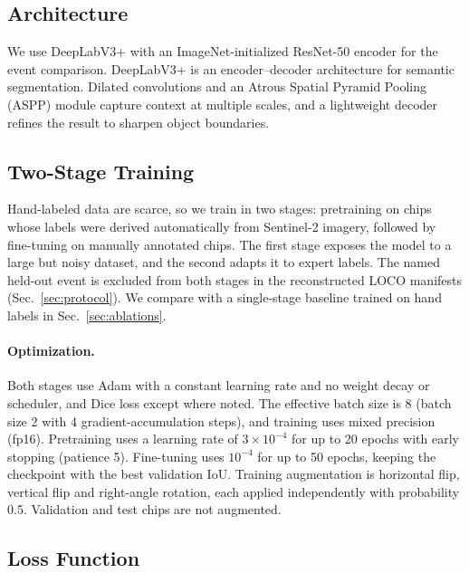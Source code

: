 \subsection{Architecture}

We use DeepLabV3+ \cite{chen2018deeplabv3plus} with an ImageNet-initialized
ResNet-50 encoder \cite{he2016resnet} for the event comparison.
DeepLabV3+ is an encoder--decoder architecture for semantic segmentation.
Dilated convolutions and an Atrous Spatial Pyramid Pooling (ASPP) module
capture context at multiple scales, and a lightweight decoder refines
the result to sharpen object boundaries.

\subsection{Two-Stage Training}
\label{sec:training}

Hand-labeled data are scarce, so we train in two stages: pretraining
on chips whose labels were derived automatically from Sentinel-2 imagery,
followed by fine-tuning on manually annotated chips. The first stage
exposes the model to a large but noisy dataset, and the second adapts it
to expert labels. The named held-out event is excluded from both stages
in the reconstructed LOCO manifests (Sec.~\ref{sec:protocol}). We compare
with a single-stage baseline trained on hand labels in
Sec.~\ref{sec:ablations}.

\paragraph{Optimization.}
Both stages use Adam with a constant learning rate and no weight decay
or scheduler, and Dice loss except where noted. The effective batch
size is 8 (batch size 2 with 4 gradient-accumulation steps), and training
uses mixed precision (fp16). Pretraining uses a learning rate of
$3\times10^{-4}$ for up to 20 epochs with early stopping (patience 5).
Fine-tuning uses $10^{-4}$ for up to 50 epochs, keeping the checkpoint
with the best validation IoU. Training augmentation is horizontal flip,
vertical flip and right-angle rotation, each applied independently
with probability 0.5. Validation and test chips are not augmented.

\subsection{Loss Function}

